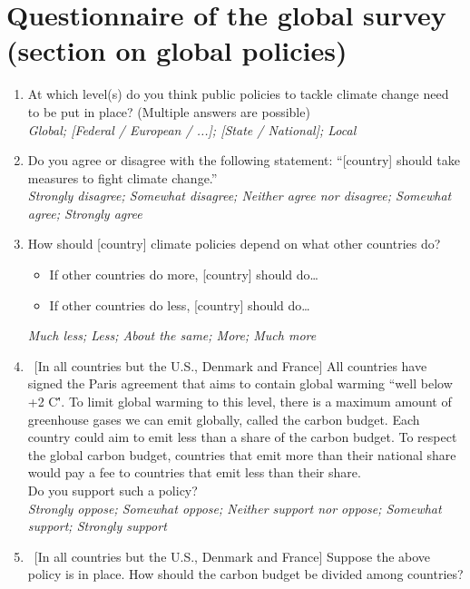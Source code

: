 \section{Questionnaire of the global survey (section on global policies)}\label{app:questionnaire_oecd}
\begin{enumerate} \item \label{q:scale} At which level(s) do you think public policies to tackle climate change need to be put in place? (Multiple answers are possible)
\\ \textit{Global; [Federal / European / ...]; [State / National]; Local}
\item Do you agree or disagree with the following statement: ``[country] should take measures to fight climate change.''
	\\ \textit{Strongly disagree; Somewhat disagree; Neither agree nor disagree; Somewhat agree; Strongly agree}
\item How should [country] climate policies depend on what other countries do?
 \begin{itemize}
\item If other countries do more, [country] should do…
\item If other countries do less, [country] should do…
\end{itemize}
\textit{Much less; Less; About the same; More; Much more}
\item ~[In all countries but the U.S., Denmark and France]  All countries have signed the Paris agreement that aims to contain global warming ``well below +2 \textdegree{}C\''. To limit global warming to this level, there is a maximum amount of greenhouse gases we can emit globally, called the carbon budget. Each country could aim to emit less than a share of the carbon budget. To respect the global carbon budget, countries that emit more than their national share would pay a fee to countries that emit less than their share. \\ 
Do you support such a policy?
\\ \textit{Strongly oppose; Somewhat oppose; Neither support nor oppose; Somewhat support; Strongly support}
\item ~[In all countries but the U.S., Denmark and France] Suppose the above policy is in place. How should the carbon budget be divided among countries?

\end{enumerate}
